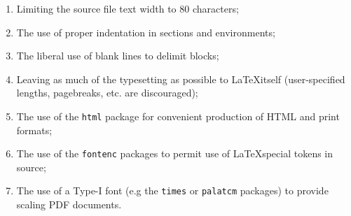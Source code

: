 \begin{enumerate}
\item Limiting the source file text width to 80 characters;
\item The use of proper indentation in sections and environments;
\item The liberal use of blank lines to delimit blocks;
\item Leaving as much of the typesetting as possible to \LaTeX itself
  (user-specified lengths, pagebreaks, etc. are discouraged);
\item The use of the \texttt{html} package for convenient production
  of HTML and print formats;
\item The use of the \texttt{fontenc} packages
  to permit use of \LaTeX special tokens in source;
\item The use of a Type-I font (e.g the \texttt{times} or
  \texttt{palatcm} packages) to provide scaling PDF documents.
\end{enumerate}















